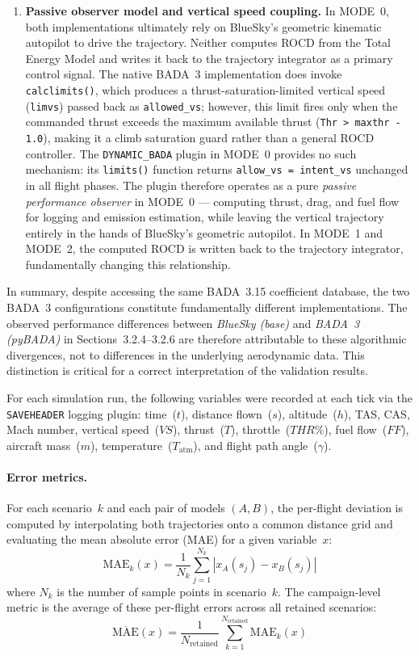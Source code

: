 \begin{enumerate}
    \item \textbf{Passive observer model and vertical speed coupling.} In MODE~0, both implementations ultimately rely on BlueSky's geometric kinematic autopilot to drive the trajectory. Neither computes ROCD from the Total Energy Model and writes it back to the trajectory integrator as a primary control signal. The native BADA~3 implementation does invoke \texttt{calclimits()}, which produces a thrust-saturation-limited vertical speed (\texttt{limvs}) passed back as \texttt{allowed\_vs}; however, this limit fires only when the commanded thrust exceeds the maximum available thrust (\texttt{Thr > maxthr - 1.0}), making it a climb saturation guard rather than a general ROCD controller. The \texttt{DYNAMIC\_BADA} plugin in MODE~0 provides no such mechanism: its \texttt{limits()} function returns \texttt{allow\_vs = intent\_vs} unchanged in all flight phases. The plugin therefore operates as a pure \emph{passive performance observer} in MODE~0 — computing thrust, drag, and fuel flow for logging and emission estimation, while leaving the vertical trajectory entirely in the hands of BlueSky's geometric autopilot. In MODE~1 and MODE~2, the computed ROCD is written back to the trajectory integrator, fundamentally changing this relationship.
\end{enumerate}

In summary, despite accessing the same BADA~3.15 coefficient database, the two BADA~3 configurations constitute fundamentally different implementations. The observed performance differences between \emph{BlueSky (base)} and \emph{BADA~3 (pyBADA)} in Sections~3.2.4--3.2.6 are therefore attributable to these algorithmic divergences, not to differences in the underlying aerodynamic data. This distinction is critical for a correct interpretation of the validation results.

For each simulation run, the following variables were recorded at each tick via the \texttt{SAVEHEADER} logging plugin: time~($t$), distance flown~($s$), altitude~($h$), TAS, CAS, Mach number, vertical speed~($VS$), thrust~($T$), throttle~($THR\%$), fuel flow~($FF$), aircraft mass~($m$), temperature~($T_{\text{atm}}$), and flight path angle~($\gamma$).

\paragraph{Error metrics.}
For each scenario~$k$ and each pair of models $(A, B)$, the per-flight deviation is computed by interpolating both trajectories onto a common distance grid and evaluating the mean absolute error (MAE) for a given variable~$x$:
\begin{equation}
    \text{MAE}_{k}(x) = \frac{1}{N_k} \sum_{j=1}^{N_k} \left| x_{A}(s_j) - x_{B}(s_j) \right|
\end{equation}
where $N_k$ is the number of sample points in scenario~$k$. The campaign-level metric is the average of these per-flight errors across all retained scenarios:
\begin{equation}
    \overline{\text{MAE}}(x) = \frac{1}{N_{\text{retained}}} \sum_{k=1}^{N_{\text{retained}}} \text{MAE}_{k}(x)
\end{equation}

